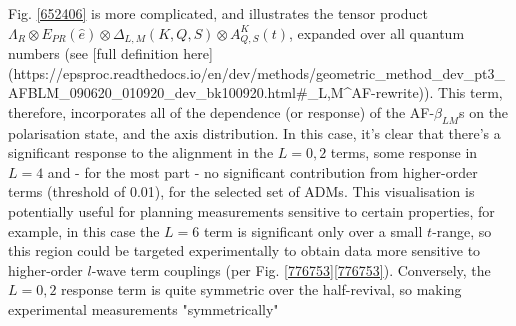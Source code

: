 Fig. \ref{652406} is more complicated, and illustrates the tensor product $\Lambda_{R}\otimes E_{PR}(\hat{e})\otimes \Delta_{L,M}(K,Q,S)\otimes A^{K}_{Q,S}(t)$, expanded over all quantum numbers (see [full definition here](https://epsproc.readthedocs.io/en/dev/methods/geometric_method_dev_pt3_AFBLM_090620_010920_dev_bk100920.html#\beta_{L,M}^{AF}-rewrite)). This term, therefore, incorporates all of the dependence (or response) of the AF-$\beta_{LM}$s on the polarisation state, and the axis distribution. In this case, it's clear that there's a significant response to the alignment in the $L=0,2$ terms, some response in $L=4$ and - for the most part - no significant contribution from higher-order terms (threshold of 0.01), for the selected set of ADMs. This visualisation is potentially useful for planning measurements sensitive to certain properties, for example, in this case the $L=6$ term is significant only over a small $t$-range, so this region could be targeted experimentally to obtain data more sensitive to higher-order $l$-wave term couplings (per Fig. \ref{776753}\ref{776753}). Conversely, the $L=0,2$ response term is quite symmetric over the half-revival, so making experimental measurements "symmetrically"

